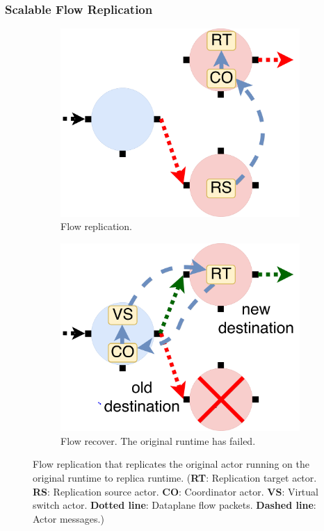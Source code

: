 \subsubsection{Scalable Flow Replication}

\begin{figure}[!h]
\begin{subfigure}[t]{0.49\linewidth}
   \centering
   \includegraphics[width=0.66\columnwidth]{figure/nfactor-replication.pdf}
   \caption{Flow replication.}\label{fig:rep}
  \end{subfigure}
  \begin{subfigure}[t]{0.49\linewidth}
     \centering
     \includegraphics[width=0.66\columnwidth]{figure/nfactor-recover.pdf}
     \caption{Flow recover. The original runtime has failed.}\label{fig:recover}
    \end{subfigure}
 \caption{Flow replication that replicates the original actor running on the original runtime to replica runtime. (\textbf{RT}: Replication target actor. \textbf{RS}: Replication source actor. \textbf{CO}: Coordinator actor. \textbf{VS}: Virtual switch actor. \textbf{Dotted line}: Dataplane flow packets. \textbf{Dashed line}: Actor messages.)}
\label{fig:flow-rep}
\end{figure}

